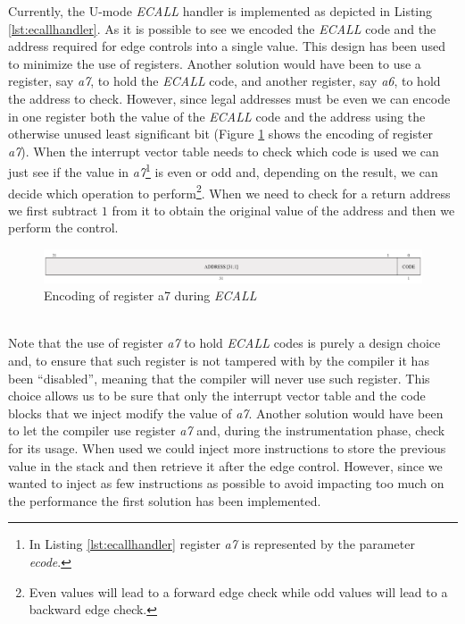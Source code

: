 Currently, the U-mode \textit{ECALL} handler is implemented as depicted in
Listing \ref{lst:ecallhandler}. As it is possible to see we encoded the \textit{ECALL}
code and the address required for edge controls into a single value. This design
has been used to minimize the use of registers. Another solution would have been
to use a register, say \textit{a7}, to hold the \textit{ECALL} code, and another
register, say \textit{a6}, to hold the address to check. However, since legal
addresses must be even we can encode in one register both the value of the
\textit{ECALL} code and the address using the otherwise unused least significant
bit (Figure \ref{fig:ecall} shows the encoding of register \textit{a7}). When the
interrupt vector table needs to check which code is used we can just see if the value
in \textit{a7}\footnote{In Listing \ref{lst:ecallhandler} register \textit{a7} is
represented by the parameter \textit{ecode}.} is even or odd and, depending on
the result, we can decide which operation to perform\footnote{Even values will
lead to a forward edge check while odd values will lead to a backward edge check.}.
When we need to check for a return address we first subtract $1$ from it to obtain
the original value of the address and then we perform the control. \\
\begin{figure}[htbp]
  \centering
  \includegraphics[width=.9\linewidth]{images/ecall_code.png}
  \caption{Encoding of register a7 during \textit{ECALL}}
  \label{fig:ecall}
\end{figure}
\\

Note that the use of register \textit{a7} to hold \textit{ECALL} codes is purely
a design choice and, to ensure that such register is not tampered with by the
compiler it has been ``disabled'', meaning that the compiler will never use such
register. This choice allows us to be sure that only the interrupt vector table
and the code blocks that we inject modify the value of \textit{a7}. Another
solution would have been to let the compiler use register \textit{a7} and,
during the instrumentation phase, check for its usage. When used we could inject
more instructions to store the previous value in the stack and then retrieve it
after the edge control. However, since we wanted to inject as few instructions
as possible to avoid impacting too much on the performance the first solution
has been implemented.

